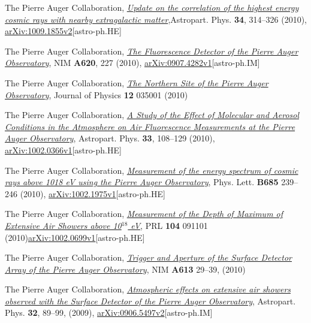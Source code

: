 \documentclass[11pt, a4paper]{article}
\newcommand{\years}[1]{\marginnote{\scriptsize #1}}
\begin{document}
\years{2010}The Pierre Auger Collaboration,
\href{http://dx.doi.org/10.1016/j.astropartphys.2010.08.010}{\emph{Update on
the correlation of the highest energy cosmic rays with nearby extragalactic
matter}},Astropart. Phys. {\bf 34}, 314--326 (2010),
\href{http://arxiv.org/abs/1009.1855}{arXiv:1009.1855v2}[astro-ph.HE]

\years{2010}The Pierre Auger Collaboration,
\href{http://dx.doi.org/10.1016/j.nima.2010.04.023}{\emph{The Fluorescence
Detector of the Pierre Auger Observatory}}, NIM {\bf A620}, 227 (2010),
\href{http://arxiv.org/abs/0907.4282}{arXiv:0907.4282v1}[astro-ph.IM]

\years{2010}The Pierre Auger Collaboration,
\href{http://dx.doi.org/10.1088/1367-2630/12/3/035001}{\emph{The Northern Site
of the Pierre Auger Observatory}}, Journal of Physics {\bf 12} 035001 (2010)

\years{2010}The Pierre Auger Collaboration,
\href{http://dx.doi.org/10.1016/j.astropartphys.2009.12.005}{\emph{A Study of
the Effect of Molecular and Aerosol Conditions in the Atmosphere on Air
Fluorescence Measurements at the Pierre Auger Observatory}}, Astropart. Phys.
{\bf 33}, 108--129 (2010),
\href{http://arxiv.org/abs/0907.4282}{arXiv:1002.0366v1}[astro-ph.HE]

\years{2010}The Pierre Auger Collaboration,
\href{http://dx.doi.org/10.1016/j.physletb.2010.02.013}{\emph{Measurement of
the energy spectrum of cosmic rays above 1018 eV using the Pierre Auger
Observatory}}, Phys. Lett. {\bf B685} 239--246 (2010),
\href{http://arxiv.org/abs/1002.1975}{arXiv:1002.1975v1}[astro-ph.HE]

\years{2010}The Pierre Auger Collaboration,
\href{http://dx.doi.org/10.1103/PhysRevLett.104.091101}{\emph{Measurement of
the Depth of Maximum of Extensive Air Showers above 10$^{18}$ eV}}, PRL {\bf
104} 091101
(2010)\href{http://arxiv.org/abs/1002.0699}{arXiv:1002.0699v1}[astro-ph.HE]

\years{2010}The Pierre Auger Collaboration,
\href{http://dx.doi.org/10.1016/j.nima.2009.11.018}{\emph{Trigger and Aperture
of the Surface Detector Array of the Pierre Auger Observatory}}, NIM {\bf A613}
29--39, (2010)

\years{2009} The Pierre Auger Collaboration,
\href{http://dx.doi.org/10.1016/j.astropartphys.2009.06.004}{\emph{Atmospheric
effects on extensive air showers observed with the Surface Detector of the
Pierre Auger Observatory}}, Astropart. Phys. {\bf 32}, 89--99, (2009),
\href{http://arxiv.org/abs/0906.5497/}{arXiv:0906.5497v2}[astro-ph.IM]
\end{document}

